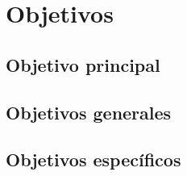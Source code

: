 \chapter{Objetivos}


\section{Objetivo principal}


\section{Objetivos generales}


\section{Objetivos específicos}


